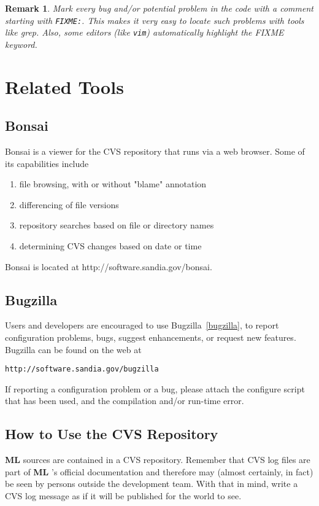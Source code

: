 \documentclass[10pt,letter,relax]{SANDreport}
\newtheorem{remark}{Remark}
\newcommand{\ML}     {{\bf ML }}
\begin{document}
\begin{remark} 
  Mark every bug and/or potential problem in the code with a comment
  starting with \verb!FIXME:!. This makes it very easy to locate such
  problems with tools like grep. Also, some editors (like \verb!vim!)
  automatically highlight the FIXME keyword.
\end{remark}


\section{Related Tools}
\label{sec:tools}
%
\subsection{Bonsai}
\label{bonsai}
Bonsai is a viewer for the CVS repository that runs via a web browser.
Some of its capabilities include
        \begin{enumerate}
	\item file browsing, with or without "blame" annotation
	\item differencing of file versions
	\item repository searches based on file or directory names
	\item determining CVS changes based on date or time
        \end{enumerate}
Bonsai is located at http://software.sandia.gov/bonsai.
%
\subsection{Bugzilla}
%
Users and developers are encouraged to use Bugzilla~\ref{bugzilla}, to
report configuration problems, bugs, suggest enhancements, or request
new features. Bugzilla can be found on the web at 
\begin{verbatim}
http://software.sandia.gov/bugzilla
\end{verbatim}
If reporting a configuration problem or a bug, please attach the
configure script that has been used, and the compilation and/or run-time
error.

\subsection{How to Use the CVS Repository}

\ML sources are contained in a CVS repository. 
Remember that CVS log files are part of \ML's official
  documentation and therefore may (almost certainly, in fact) be seen by
  persons outside the development team.  With that in mind, write a CVS
  log message as if it will be published for the world to see.
\end{document}
